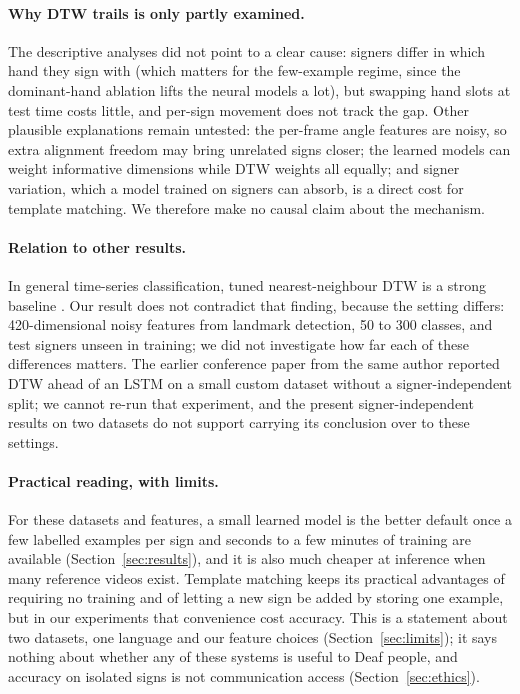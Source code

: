 \paragraph{Why DTW trails is only partly examined.} The descriptive analyses did not point to a clear cause: signers differ in which hand they sign with (which matters
for the few-example regime, since the dominant-hand ablation lifts the neural models a lot), but swapping hand slots at test time costs little, and per-sign movement does not
track the gap. Other plausible explanations remain untested: the per-frame angle features are noisy, so extra alignment freedom may bring unrelated signs closer; the learned
models can weight informative dimensions while DTW weights all equally; and signer variation, which a model trained on \nSignersTrain{} signers can absorb, is a direct cost for
template matching. We therefore make no causal claim about the mechanism.

\paragraph{Relation to other results.} In general time-series classification, tuned nearest-neighbour DTW is a strong baseline
\citep{bagnall2014nn}. Our result does not contradict that finding, because the setting differs: 420-dimensional noisy features
from landmark detection, 50 to 300 classes, and test signers unseen in training; we did not investigate how far each of these differences
matters. The earlier conference paper from the same author \citep{mankar2024} reported DTW ahead of an LSTM on a small custom
dataset without a signer-independent split; we cannot re-run that experiment, and the present signer-independent results on two datasets do not
support carrying its conclusion over to these settings.

\paragraph{Practical reading, with limits.} For these datasets and features, a small learned model is the better default once
a few labelled examples per sign and seconds to a few minutes of training are available (Section~\ref{sec:results}), and it
is also much cheaper at inference when many reference videos exist. Template matching keeps its practical advantages of requiring no training
and of letting a new sign be added by storing one example, but in our experiments that convenience cost accuracy. This is a statement about two datasets,
one language and our feature choices (Section~\ref{sec:limits}); it says nothing about whether any of these systems is useful to Deaf people,
and accuracy on isolated signs is not communication access (Section~\ref{sec:ethics}).
